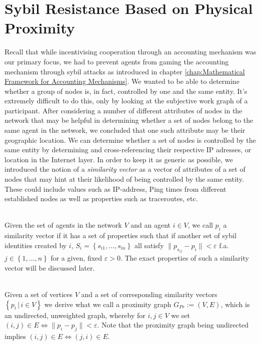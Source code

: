 \section{Sybil Resistance Based on Physical Proximity}
\label{sec:Sybil Resistance Based on Physical Proximity}
\noindent{}Recall that while incentivising cooperation through an accounting mechanism was our primary focus, we had to prevent agents from gaming the accounting mechanism through sybil attacks as introduced in chapter \ref{chap:Mathematical Framework for Accounting Mechanisms}. We wanted to be able to determine whether a group of nodes is, in fact, controlled by one and the same entity. It's extremely difficult to do this, only by looking at the subjective work graph of a participant. After considering a number of different attributes of nodes in the network that may be helpful in determining whether a set of nodes belong to the same agent in the network, we concluded that one such attribute may be their geographic location. We can determine whether a set of nodes is controlled by the same entity by determining and cross-referencing their respective IP adresses, or location in the Internet layer. In order to keep it as generic as possible, we introduced the notion of a {\it similarity vector} as a vector of attributes of a set of nodes that may hint at their likelihood of being controlled by the same entity. These could include values such as IP-address, Ping times from different established nodes as well as properties such as traceroutes, etc.  \vspace{1em}\\

\begin{definition}\ \\
Given the set of agents in the network $V$ and an agent $i\in{}V$, we call $p_i$ a similarity vector if it has a set of properties such that if another set of sybil identities created by $i$, $S_i=\left\lbrace{}s_{i1},\ldots,s_{in}\right\rbrace$ all satisfy $\|p_{s_{ij}}-p_i\|<\varepsilon$ f.a. $j\in\left\lbrace{}1,\ldots,n\right\rbrace$ for a given, fixed $\varepsilon > 0$. The exact properties of such a similarity vector will be discussed later. %
\end{definition}

\begin{definition}\ \\
Given a set of vertices $V$ and a set of corresponding similarity vectors $\left\lbrace{}p_i\,|\,i\in{}V\right\rbrace$ we derive what we call a proximity graph $G_{Pr}:=(V,E)$, which is an undirected, unweighted graph, whereby for $i,j\in{}V$ we set $(i,j)\in{}E\Leftrightarrow\|p_i-p_j\|<\varepsilon$. Note that the proximity graph being undirected implies $(i,j)\in{}E\Leftrightarrow(j,i)\in{}E$.
\end{definition}

